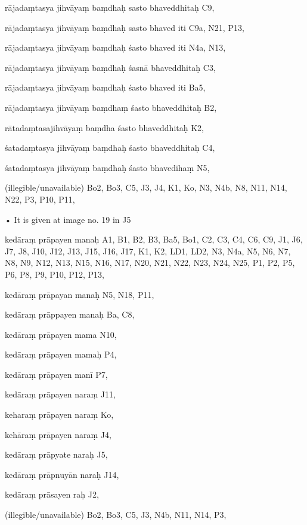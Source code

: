 \begin{marma}[hp02_022]
\item[rājadaṃtasya jihvāyaṃ baṃdhaḥ sasto bhaveddhitaḥ] C9,
\item[rājadaṃtasya jihvāyaṃ baṃdhaḥ sasto bhaved iti] C9a, N21, P13, 
\item[rājadaṃtasya jihvāyaṃ baṃdhaḥ śasto bhaved iti] N4a, N13, 
\item[rājadaṃtasya jihvāyaṃ baṃdhaḥ śasnā bhaveddhitaḥ] C3,
\item[rājadaṃtasya jihvāyaṃ baṃdhaḥ śasto bhaved iti] Ba5,
\item[rājadaṃtasya jihvāyaṃ baṃdhaṃ śasto bhaveddhitaḥ] B2,
\item[rātadaṃtasajihvāyaṃ baṃdha śasto bhaveddhitaḥ] K2,
\item[śatadaṃtasya jihvāyaṃ baṃdhaḥ śasto bhaveddhitaḥ] C4,
\item[śatadaṃtasya jihvāyaṃ baṃdhaḥ śasto bhavedihaṃ] N5,
\item[(illegible/unavailable)] Bo2, Bo3, C5, J3, J4, K1, Ko, N3, N4b, N8, N11, N14, N22, P3, P10, P11, 

  \begin{description}
    • It is given at image no. 19 in J5
    \end{description}

  \end{marma}

\begin{marma}[hp02_024]


\item[kedāraṃ prāpayen manaḥ] A1, B1, B2, B3, Ba5, Bo1, C2, C3, C4, C6, C9, J1, J6, J7, J8, J10, J12, J13, J15, J16, J17, K1, K2, LD1, LD2, N3, N4a, N5, N6, N7, N8, N9, N12, N13, N15, N16, N17, N20, N21, N22, N23, N24, N25, P1, P2, P5, P6, P8, P9, P10, P12, P13, 
\item[kedāraṃ prāpayan manaḥ] N5, N18, P11, 
\item[kedāraṃ prāppayen manaḥ] Ba, C8, 
\item[kedāraṃ prāpayen mama] N10,
\item[kedāraṃ prāpayen mamaḥ] P4,
\item[kedāraṃ prāpayen manī] P7,
\item[kedāraṃ prāpayen naraṃ] J11,
\item[keharaṃ prāpayen naraṃ] Ko,
\item[kehāraṃ prāpayen naraṃ] J4, 
\item[kedāraṃ prāpyate naraḥ] J5,
\item[kedāraṃ prāpnuyān naraḥ] J14,
\item[kedāraṃ prāsayen raḥ] J2,
  \item[(illegible/unavailable)] Bo2, Bo3, C5, J3, N4b, N11, N14, P3,

  \begin{description}
    \end{description}

  \end{marma}


